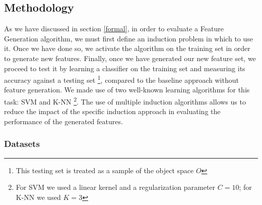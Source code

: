 \documentclass[twoside,11pt]{article}
\theoremstyle{definition}
\begin{document}
\subsection{Methodology}

As we have discussed in section \ref{formal}, in order to evaluate a Feature Generation algorithm, we must first define an induction problem in which to use it. Once we have done so, we activate the algorithm on the training set in order to generate new features. Finally, once we have generated our new feature set, we proceed to test it by learning a classifier on the training set and measuring its accuracy against a testing set \footnote{This testing set is treated as a sample of the object space $O$}, compared to the baseline approach without feature generation. We made use of two well-known learning algorithms for this task: SVM \cite{cortes1995support} and K-NN \cite{fix1951discriminatory}\footnote{For SVM we used a linear kernel and a regularization parameter $C=10$; for K-NN we used $K=3$}.
The use of multiple induction algorithms allows us to reduce the impact of the specific induction approach in evaluating the performance of the generated features.

\subsubsection{Datasets}
\end{document}
